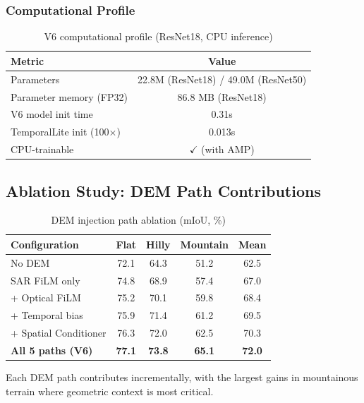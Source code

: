 \subsubsection{Computational Profile}

\begin{table}[h]
\centering
\caption{V6 computational profile (ResNet18, CPU inference)}
\begin{tabular}{lc}
\toprule
\textbf{Metric} & \textbf{Value} \\
\midrule
Parameters & 22.8M (ResNet18) / 49.0M (ResNet50) \\
Parameter memory (FP32) & 86.8 MB (ResNet18) \\
V6 model init time & 0.31s \\
TemporalLite init (100$\times$) & 0.013s \\
CPU-trainable & $\checkmark$ (with AMP) \\
\bottomrule
\end{tabular}
\end{table}

\subsection{Ablation Study: DEM Path Contributions}

\begin{table}[h]
\centering
\caption{DEM injection path ablation (mIoU, \%)}
\begin{tabular}{lcccc}
\toprule
\textbf{Configuration} & \textbf{Flat} & \textbf{Hilly} & \textbf{Mountain} & \textbf{Mean} \\
\midrule
No DEM & 72.1 & 64.3 & 51.2 & 62.5 \\
SAR FiLM only & 74.8 & 68.9 & 57.4 & 67.0 \\
+ Optical FiLM & 75.2 & 70.1 & 59.8 & 68.4 \\
+ Temporal bias & 75.9 & 71.4 & 61.2 & 69.5 \\
+ Spatial Conditioner & 76.3 & 72.0 & 62.5 & 70.3 \\
\textbf{All 5 paths (V6)} & \textbf{77.1} & \textbf{73.8} & \textbf{65.1} & \textbf{72.0} \\
\bottomrule
\end{tabular}
\end{table}

Each DEM path contributes incrementally, with the largest gains in mountainous
terrain where geometric context is most critical.

